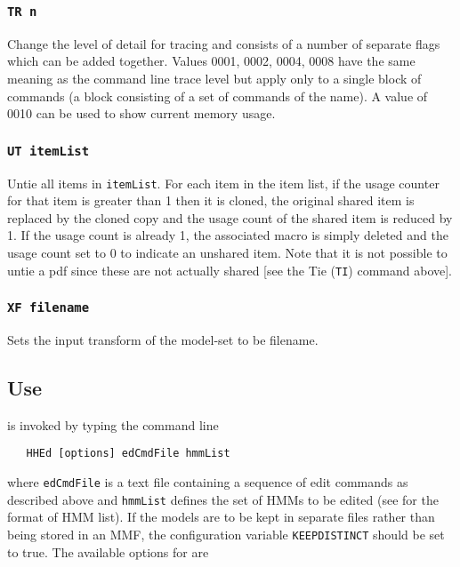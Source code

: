 \subsubsection*{\tt TR n}

Change the level of detail for tracing and consists of a number
of separate flags which can be added together.
Values 0001, 0002, 0004, 0008 have the same meaning as the command
line trace level but apply only to a single block of commands
(a block consisting of a set of commands of the name).
A value of 0010 can be used to show current memory usage.

\subsubsection*{\tt UT itemList}

Untie all items in \texttt{itemList}.  For each item in the item list,
if the usage counter for that item is greater than 1 then it
is cloned, the original shared item is replaced by the cloned copy
and the usage count of the shared item is reduced by 1. 
If the usage count is already 1, the associated macro is simply
deleted and the usage count set to 0 to indicate an unshared item.
Note that it is not possible to untie a pdf since these are not
actually shared [see the Tie (\texttt{TI}) command above].

\subsubsection*{\tt XF filename}

Sets the input transform of the model-set to be filename.

\subsection{Use}

 is invoked by typing the command line
\begin{verbatim}
   HHEd [options] edCmdFile hmmList
\end{verbatim}
where \texttt{edCmdFile} is a text file containing a sequence of edit commands
as described above and \texttt{hmmList} defines the set of HMMs to be edited
(see  for the format of HMM list). 
If the models are to be kept in separate files rather than being stored in an
MMF, the configuration variable \texttt{KEEPDISTINCT} should be set to true.
The available options for  are


